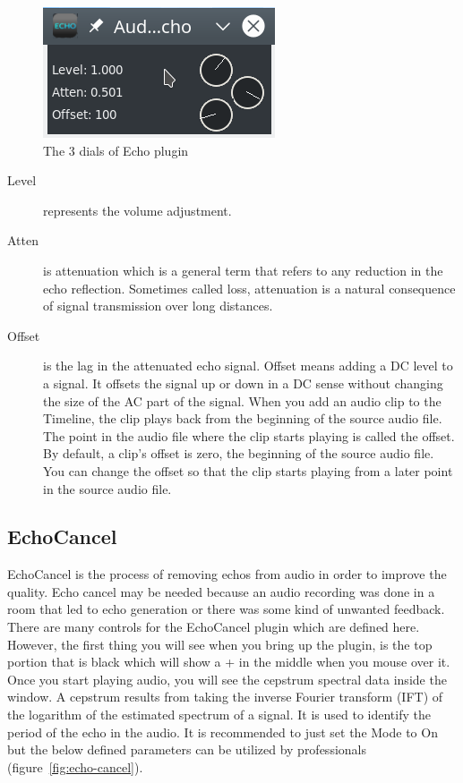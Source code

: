 \begin{figure}[htpb]
    \centering
    \includegraphics[width=0.5\linewidth]{images/echo.png}
    \caption{The 3 dials of Echo plugin}
    \label{fig:echo}
\end{figure}

\begin{description}
    \item[Level] represents the volume adjustment.
    \item[Atten] is attenuation which is a general term that refers to any reduction in the echo reflection. Sometimes called loss, attenuation is a natural consequence of signal transmission over long distances.    
    \item[Offset] is the lag in the attenuated echo signal. Offset means adding a DC level to a signal. It offsets the signal up or down in a DC sense without changing the size of the AC part of the signal. When you add an audio clip to the Timeline, the clip plays back from the beginning of the source audio file. The point in the audio file where the clip starts playing is called the offset. By default, a clip’s offset is zero, the beginning of the source audio file. You can change the offset so that the clip starts playing from a later point in the source audio file.
\end{description}

\subsection{EchoCancel}%
\label{sub:echocancel}

EchoCancel is the process of removing echos from audio in order to improve the quality. Echo cancel may be needed because an audio recording was done in a room that led to echo generation or there was some kind of unwanted feedback. There are many controls for the EchoCancel plugin which are defined here. However, the first thing you will see when you bring up the plugin, is the top portion that is black which will show a + in the middle when you mouse over it. Once you start playing audio, you will see the cepstrum spectral data inside the window. A cepstrum results from taking the inverse Fourier transform (IFT) of the logarithm of the estimated spectrum of a signal. It is used to identify the period of the echo in the audio. It is recommended to just set the Mode to On but the below defined parameters can be utilized by professionals (figure~\ref{fig:echo-cancel}).

